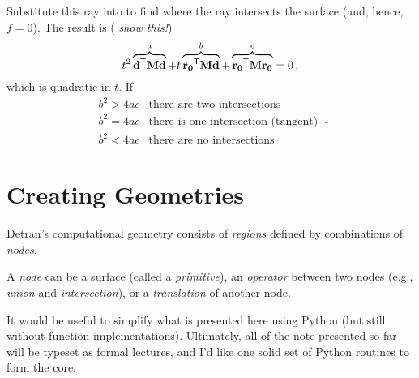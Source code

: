 \vfill
Substitute this ray into  to find 
where the ray intersects the surface (and, hence, $f=0$).
The result is (\emph{ show this!})
\begin{equation}
  t^2 \overbrace{\mathbf{d}^{\mathsf{T}} \mathbf{M} \mathbf{d}}^{a}
  + t \overbrace{\mathbf{r_0}^{\mathsf{T}} \mathbf{M} \mathbf{d}}^{b}
  +   \overbrace{\mathbf{r_0}^{\mathsf{T}} \mathbf{M} \mathbf{r_0}}^{c} = 0 \, ,
\end{equation}
which is quadratic in $t$.  If  
\begin{equation*}
  \begin{array}{cc}
      b^2 > 4ac & \text{there are two intersections} \\
      b^2 = 4ac & \text{there is one intersection (tangent)} \\
      b^2 < 4ac & \text{there are no intersections} 
  \end{array}
 \, . 
\end{equation*}


\section*{Creating Geometries}

Detran's computational geometry consists of \emph{ regions} 
defined by combinations of \emph{ nodes}. 

 

A \emph{ node} can be a  surface (called a \emph{ primitive}), 
an \emph{ operator} between two nodes (e.g., \emph{ union} and 
\emph{ intersection}), or a \emph{ translation} of another 
node.

 
It would be useful to simplify what is presented here using 
Python (but still without function implementations).  Ultimately,
all of the note presented so far will be typeset as formal
lectures, and I'd like one solid set of Python routines to 
form the core.

